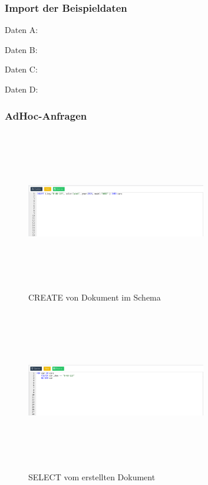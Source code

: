 \subsubsection{Import der Beispieldaten}
Daten A:

Daten B:

Daten C:

Daten D:

\subsubsection{AdHoc-Anfragen}

\begin{figure}[htbp] 
  	\centering
     \includegraphics[width=0.7\textwidth, height=200pt, draft]{./images/create.png}
 	\caption{CREATE von Dokument im Schema}
  \label{fig:DataSchema}
\end{figure}
\begin{figure}[htbp] 
  	\centering
     \includegraphics[width=0.7\textwidth, height=200pt, draft]{./images/select.png}
 	\caption{SELECT vom erstellten Dokument}
  \label{fig:DataSchema}
\end{figure}
